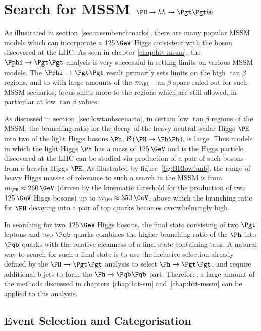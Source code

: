 \chapter{Search for MSSM $\PH \to hh \to \Pgt\Pgt bb$}
\label{chap:Hhh}

As illustrated in section~\ref{sec:mssmbenchmarks}, there are many popular
\ac{MSSM} models which can incorporate a $125\,\GeV$ Higgs consistent with the boson
discovered at the LHC. As seen in chapter \ref{chap:htt-mssm}, the 
$\Pphi \to \Pgt\Pgt$ analysis is very successful in 
setting limits on various \ac{MSSM} models. The $\Pphi \to \Pgt \Pgt$ result primarily sets
limits on the high $\tan\beta$ regions, and so with large amounts of the
$m_{\PA}$--$\tan\beta$ space ruled out for such \ac{MSSM} scenarios, focus shifts more 
to the regions which are still allowed, in particular at low $\tan\beta$ values.

As discussed in section~\ref{sec:lowtanbscenario}, in certain low $\tan\beta$ regions 
of the \ac{MSSM}, the branching ratio for the
decay of the heavy neutral scalar Higgs $\PH$ into two of the light Higgs
bosons $\Ph$, $\cal{B}$($\PH \to \Ph\Ph$), is large. Thus models in which the
light Higgs $\Ph$ has a mass of $125\,\GeV$ and is the Higgs particle discovered at the
LHC can be studied via production of a pair of such bosons from a
heavier Higgs $\PH$. As illustrated by figure~\ref{fig:BRlowtanb}, the range of heavy 
Higgs masses of relevance to such a search in the \ac{MSSM} is from $m_{\PH}\approx260\,\GeV$ 
(driven by the kinematic threshold for the production of two $125\,\GeV$ Higgs
bosons) up to $m_{\PH}\approx350\,\GeV$, above which the branching ratio for 
$\PH$ decaying into a pair of top quarks becomes overwhelmingly high.

In searching for two $125\,\GeV$ Higgs bosons, the final state consisting of two
$\Pgt$ leptons and two $\Pqb$ quarks combines the higher branching ratio of the
$\Ph$ into $\Pqb$ quarks with the relative cleanness of a final state containing
taus. A natural way to search for such a final state is to use the inclusive
selection already defined by the $\PH\to\Pgt\Pgt$ analysis to select $\Ph\to\Pgt\Pgt$, 
and require additional b-jets to form the $\Ph\to\Pqb\Pqb$ part. 
Therefore, a large amount of the methods discussed in chapters~\ref{chap:htt-sm} 
and~\ref{chap:htt-mssm} can be applied to this analysis.

\section{Event Selection and Categorisation}
\label{sec:HhhEventSelection}

